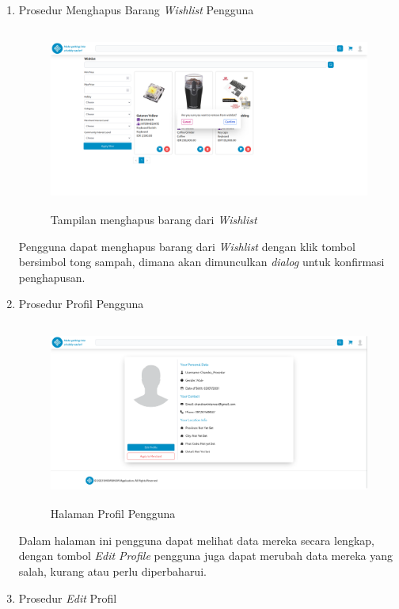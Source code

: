 \documentclass[a4paper]{article}
\begin{document}
\begin{enumerate}
\item Prosedur Menghapus Barang \textit{Wishlist} Pengguna

\begin{figure}[h]
    \centering
    \includegraphics*[height=6cm]{images/prosedur pengunaan aplikasi/Delete Wishlist.png}
    \caption{Tampilan menghapus barang dari \textit{Wishlist}}
\end{figure}

Pengguna dapat menghapus barang dari \textit{Wishlist} dengan klik tombol bersimbol tong sampah, dimana akan dimunculkan \textit{dialog} untuk konfirmasi penghapusan.

\item Prosedur Profil Pengguna

\begin{figure}[h]
    \centering
    \includegraphics*[height=6cm]{images/prosedur pengunaan aplikasi/User Profile.png}
    \caption{Halaman Profil Pengguna}
\end{figure}

Dalam halaman ini pengguna dapat melihat data mereka secara lengkap, dengan tombol \textit{Edit Profile} pengguna juga dapat merubah data mereka yang salah, kurang atau perlu diperbaharui.

\newpage
\item Prosedur \textit{Edit} Profil


\end{enumerate}
\end{document}
